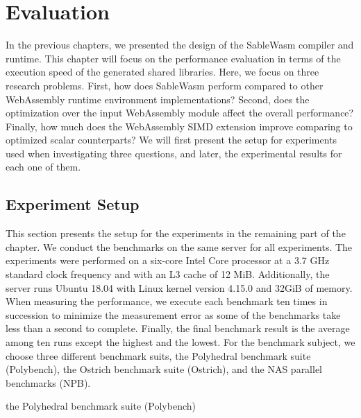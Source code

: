 \chapter{Evaluation}
\label{chapter:evaluation}

In the previous chapters, we presented the design of the SableWasm compiler and
runtime. This chapter will focus on the performance evaluation in terms of the
execution speed of the generated shared libraries. Here, we focus on three
research problems. First, how does SableWasm perform compared to other
WebAssembly runtime environment implementations? Second, does the optimization
over the input WebAssembly module affect the overall performance? Finally, how
much does the WebAssembly SIMD extension improve comparing to optimized scalar
counterparts? We will first present the setup for experiments used when
investigating three questions, and later, the experimental results for each one
of them.

\section{Experiment Setup}

This section presents the setup for the experiments in the remaining part of the
chapter. We conduct the benchmarks on the same server for all experiments.
The experiments were performed on a six-core Intel Core processor at a 3.7 GHz
standard clock frequency and with  an L3 cache of 12 MiB. Additionally, the
server runs Ubuntu 18.04 with Linux kernel version 4.15.0 and 32GiB of memory.
When measuring the performance, we execute each benchmark ten times in
succession to minimize the measurement error as some of the benchmarks take less
than a second to complete. Finally, the final benchmark result is the average
among ten runs except the highest and the lowest. For the benchmark subject,
we choose three different benchmark suits, the Polyhedral benchmark suite
(Polybench), the Ostrich benchmark suite (Ostrich), and the NAS parallel
benchmarks (NPB).

\begin{table}
    \centering
    
    \caption{the Polyhedral benchmark suite (Polybench)}
    \label{tbl:polybench}
\end{table}

